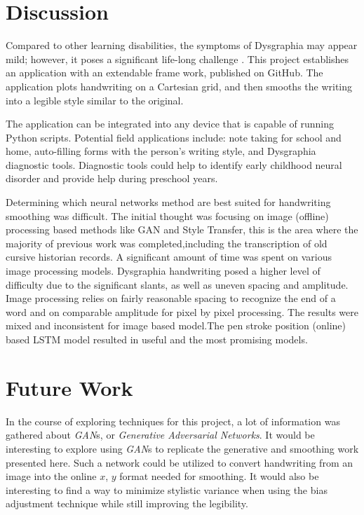 \documentclass{article}
\begin{document}
    
\section{Discussion}    
Compared to other learning disabilities, the symptoms of Dysgraphia may appear mild; however, it poses a significant life-long challenge \cite{previous-work-29}. This project establishes an application with an extendable frame work, published on GitHub. The application plots handwriting on a Cartesian grid, and then smooths the writing into a legible style similar to the original.

The application can be integrated into any device that is capable of running Python scripts. Potential field applications include: note taking for school and home, auto-filling forms with the person's writing style, and Dysgraphia diagnostic tools. Diagnostic tools could help to identify early childhood neural disorder and provide help during preschool years\cite{previous-work-31}.

Determining which neural networks method are best suited for handwriting smoothing was difficult. The initial thought was focusing on image (offline) processing based methods like GAN and Style Transfer\cite{previous-work-26}, this is the area where the majority of previous work was completed,including the transcription of old cursive historian records. A significant amount of time was spent on various image processing models. Dysgraphia handwriting posed a higher level of difficulty due to the significant slants, as well as uneven spacing and amplitude. Image processing relies on fairly reasonable spacing to recognize the end of a word and on comparable amplitude for pixel by pixel processing. The results were mixed and inconsistent for image based model.The pen stroke position (online) based LSTM model resulted in useful and the most promising models. 

\section{Future Work}
In the course of exploring techniques for this project, a lot of information was gathered about \textit{GAN}s, or \textit{Generative Adversarial Networks}. It would be interesting to explore using \textit{GAN}s to replicate the generative and smoothing work presented here. Such a network could be utilized to convert handwriting from an image into the online $x$, $y$ format needed for smoothing. It would also be interesting to find a way to minimize stylistic variance when using the bias adjustment technique while still improving the legibility.
\end{document}
